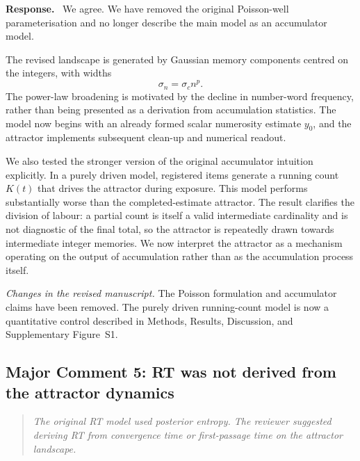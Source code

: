 \documentclass[11pt]{article}
\newenvironment{reviewercomment}{\begin{quote}\color{reviewgray}\itshape}{\end{quote}}
\newenvironment{authorresponse}{\par\noindent\textbf{\color{responseblue}Response.}\ }{\par}
\newcommand{\change}[1]{\par\noindent\textit{Changes in the revised manuscript.} #1\par}
\begin{document}
\begin{authorresponse}
We agree. We have removed the original Poisson-well parameterisation and no longer describe the main model as an accumulator model.

The revised landscape is generated by Gaussian memory components centred on the integers, with widths
\[
\sigma_n=\sigma_c n^p.
\]
The power-law broadening is motivated by the decline in number-word frequency, rather than being presented as a derivation from accumulation statistics. The model now begins with an already formed scalar numerosity estimate $y_0$, and the attractor implements subsequent clean-up and numerical readout.

We also tested the stronger version of the original accumulator intuition explicitly. In a purely driven model, registered items generate a running count $K(t)$ that drives the attractor during exposure. This model performs substantially worse than the completed-estimate attractor. The result clarifies the division of labour: a partial count is itself a valid intermediate cardinality and is not diagnostic of the final total, so the attractor is repeatedly drawn towards intermediate integer memories. We now interpret the attractor as a mechanism operating on the output of accumulation rather than as the accumulation process itself.
\end{authorresponse}

\change{The Poisson formulation and accumulator claims have been removed. The purely driven running-count model is now a quantitative control described in Methods, Results, Discussion, and Supplementary Figure~S1.}

\subsection*{Major Comment 5: RT was not derived from the attractor dynamics}

\begin{reviewercomment}
The original RT model used posterior entropy. The reviewer suggested deriving RT from convergence time or first-passage time on the attractor landscape.
\end{reviewercomment}
\end{document}
